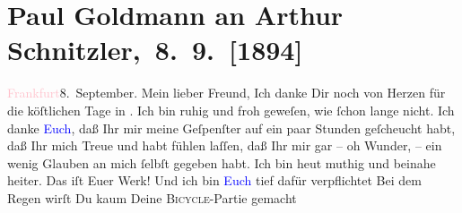 

               \section[Paul Goldmann an Arthur Schnitzler, Paul Goldmann an Arthur Schnitzler, 8. 9. {[}1894{]}]{ Paul Goldmann an Arthur Schnitzler, 8. 9. {[}1894{]}}\nopagebreak{}\rehead{ }\normalsize\beginnumbering{} \toendnotes[C]{\smallbreak\pagebreak[2]} 
\toendnotes[C]{\smallbreak}\pstart
           \raggedleft{}{\pb}\textcolor{pink}{Frankfurt}{}\ledrightnote{\textcolor{pink}{Frankfurt am Main}}{ }8. September.\pend
           \pstart\center{}Mein lieber Freund,\pend\pstart
           Ich danke Dir noch von Herzen für die köſtlichen Tage in \label{K_L02612-1v}\label{K_L02612-1h}. Ich bin
               ruhig und froh geweſen, wie ſchon lange nicht. Ich danke \textcolor{blue}{Euch}{}, daß Ihr mir meine
               Geſpenſter auf ein paar Stunden geſcheucht habt, daß Ihr mich Treue und \label{K_L02612-12v}\label{K_L02612-12h} habt fühlen laſſen, {\pb}daß Ihr mir gar – oh Wunder, – ein wenig Glauben an mich ſelbſt gegeben habt. Ich
               bin heut muthig und beinahe heiter. Das iſt Euer Werk!
               Und ich bin \textcolor{blue}{Euch}{} tief dafür \strikeout{\textcolor{gray}{v}} verpflichtet{\dotsfive}\pend
           \pstart
           Bei dem Regen wirſt Du kaum Deine \textsc{Bicycle}-Partie gemacht
